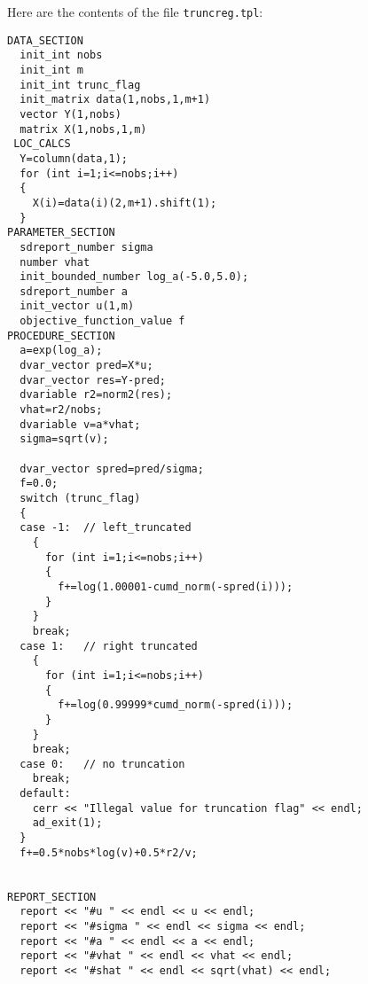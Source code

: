 Here are the contents of the file \texttt{truncreg.tpl}:
\begin{lstlisting}
DATA_SECTION
  init_int nobs
  init_int m
  init_int trunc_flag
  init_matrix data(1,nobs,1,m+1)
  vector Y(1,nobs)
  matrix X(1,nobs,1,m)
 LOC_CALCS
  Y=column(data,1);
  for (int i=1;i<=nobs;i++)
  {
    X(i)=data(i)(2,m+1).shift(1);
  }
PARAMETER_SECTION
  sdreport_number sigma
  number vhat
  init_bounded_number log_a(-5.0,5.0);
  sdreport_number a
  init_vector u(1,m)
  objective_function_value f
PROCEDURE_SECTION
  a=exp(log_a);
  dvar_vector pred=X*u;
  dvar_vector res=Y-pred;
  dvariable r2=norm2(res); 
  vhat=r2/nobs; 
  dvariable v=a*vhat;
  sigma=sqrt(v);

  dvar_vector spred=pred/sigma;
  f=0.0;
  switch (trunc_flag)
  {
  case -1:  // left_truncated
    {
      for (int i=1;i<=nobs;i++)
      {
        f+=log(1.00001-cumd_norm(-spred(i)));
      }
    }
    break;
  case 1:   // right truncated
    {
      for (int i=1;i<=nobs;i++)
      {
        f+=log(0.99999*cumd_norm(-spred(i)));
      }
    }
    break;
  case 0:   // no truncation
    break;
  default:
    cerr << "Illegal value for truncation flag" << endl;
    ad_exit(1);
  }
  f+=0.5*nobs*log(v)+0.5*r2/v;


REPORT_SECTION
  report << "#u " << endl << u << endl;
  report << "#sigma " << endl << sigma << endl;
  report << "#a " << endl << a << endl;
  report << "#vhat " << endl << vhat << endl;
  report << "#shat " << endl << sqrt(vhat) << endl;

\end{lstlisting}





